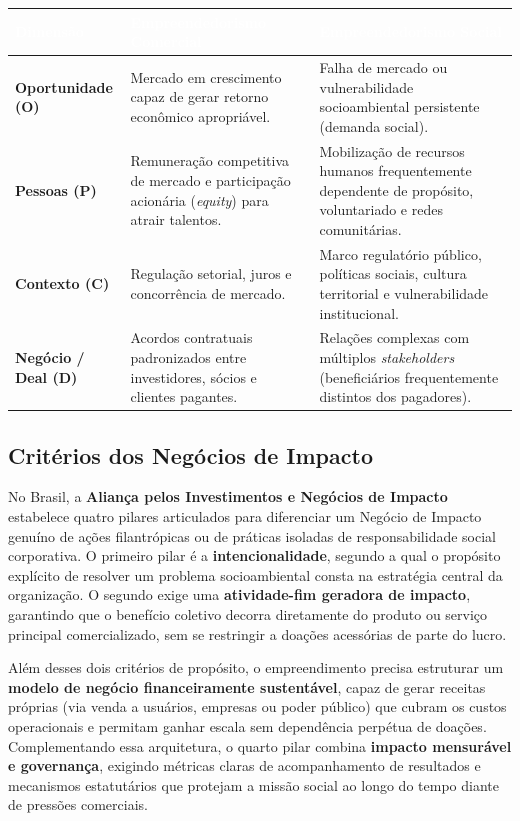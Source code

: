 \renewcommand{\arraystretch}{1.20}
\small
\begin{tabularx}{\textwidth}{@{}p{2.4cm} X X@{}}
  \toprule
  \rowcolor{etIndigo}
  \textcolor{white}{\bfseries Dimensão} & \textcolor{white}{\bfseries Empreendedorismo Comercial} & \textcolor{white}{\bfseries Empreendedorismo Social} \\
  \midrule
  \textbf{Oportunidade (O)} & Mercado em crescimento capaz de gerar retorno econômico apropriável. & Falha de mercado ou vulnerabilidade socioambiental persistente (demanda social). \\
  \rowcolor{bgGray}
  \textbf{Pessoas (P)} & Remuneração competitiva de mercado e participação acionária (\textit{equity}) para atrair talentos. & Mobilização de recursos humanos frequentemente dependente de propósito, voluntariado e redes comunitárias. \\
  \textbf{Contexto (C)} & Regulação setorial, juros e concorrência de mercado. & Marco regulatório público, políticas sociais, cultura territorial e vulnerabilidade institucional. \\
  \rowcolor{bgGray}
  \textbf{Negócio / Deal (D)} & Acordos contratuais padronizados entre investidores, sócios e clientes pagantes. & Relações complexas com múltiplos \textit{stakeholders} (beneficiários frequentemente distintos dos pagadores). \\
  \bottomrule
\end{tabularx}
\normalsize

\subsection{Critérios dos Negócios de Impacto}

No Brasil, a \textbf{Aliança pelos Investimentos e Negócios de Impacto} estabelece quatro pilares articulados para diferenciar um Negócio de Impacto genuíno de ações filantrópicas ou de práticas isoladas de responsabilidade social corporativa. O primeiro pilar é a \textbf{intencionalidade}, segundo a qual o propósito explícito de resolver um problema socioambiental consta na estratégia central da organização. O segundo exige uma \textbf{atividade-fim geradora de impacto}, garantindo que o benefício coletivo decorra diretamente do produto ou serviço principal comercializado, sem se restringir a doações acessórias de parte do lucro.

Além desses dois critérios de propósito, o empreendimento precisa estruturar um \textbf{modelo de negócio financeiramente sustentável}, capaz de gerar receitas próprias (via venda a usuários, empresas ou poder público) que cubram os custos operacionais e permitam ganhar escala sem dependência perpétua de doações. Complementando essa arquitetura, o quarto pilar combina \textbf{impacto mensurável e governança}, exigindo métricas claras de acompanhamento de resultados e mecanismos estatutários que protejam a missão social ao longo do tempo diante de pressões comerciais.

